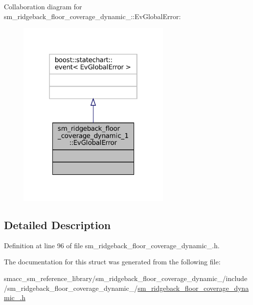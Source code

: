 Collaboration diagram for sm\+\_\+ridgeback\+\_\+floor\+\_\+coverage\+\_\+dynamic\+\_\+:\+:Ev\+Global\+Error\+:
\nopagebreak
\begin{figure}[H]
\begin{center}
\leavevmode
\includegraphics[width=214pt]{structsm__ridgeback__floor__coverage__dynamic__1_1_1EvGlobalError__coll__graph}
\end{center}
\end{figure}


\subsection{Detailed Description}


Definition at line 96 of file sm\+\_\+ridgeback\+\_\+floor\+\_\+coverage\+\_\+dynamic\+\_.\+h.



The documentation for this struct was generated from the following file\+:\begin{DoxyCompactItemize}
\item 
smacc\+\_\+sm\+\_\+reference\+\_\+library/sm\+\_\+ridgeback\+\_\+floor\+\_\+coverage\+\_\+dynamic\+\_/include/sm\+\_\+ridgeback\+\_\+floor\+\_\+coverage\+\_\+dynamic\+\_/\hyperlink{sm__ridgeback__floor__coverage__dynamic__1_8h}{sm\+\_\+ridgeback\+\_\+floor\+\_\+coverage\+\_\+dynamic\+\_.\+h}\end{DoxyCompactItemize}
